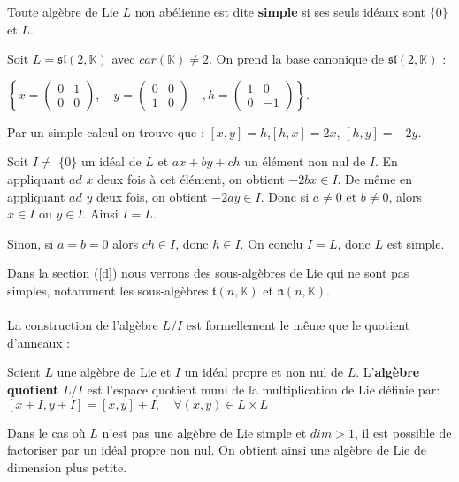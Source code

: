 \documentclass[a4paper,openany,12pt]{report}
\newcommand{\KK}{\mathbb{K}}
\newcommand{\ssl}{\mathfrak{sl}}
\newcommand{\ttt}{\mathfrak{t}}
\newcommand{\nn}{\mathfrak{n}}
\theoremstyle{break}
{\theorembodyfont{\upshape}
\newtheorem*{rmq}{Remarque :}
\newtheorem*{prv}{Preuve :}
\newtheorem*{ex}{Exemples :}
\newtheorem*{exe}{Exemple : }
\newtheorem*{nota}{Notation :}
\newtheorem*{dem}{D\'emonstration :}}
\begin{document}
\begin{df}
\quad Toute algèbre de Lie $L$ non abélienne est dite \textbf{simple} si ses seuls idéaux sont $\{ 0 \}$ et $L$.
\end{df}

\begin{exe}
\quad Soit $L = \ssl(2,\KK)$ avec $car(\KK)\ne 2$. On prend la base canonique de $\ssl(2,\KK)$ : 
\begin{center}
$\left \{ x=\begin{pmatrix} 0 & 1\\ 0 & 0 \end{pmatrix},\quad y=\begin{pmatrix} 0 & 0\\ 1 & 0 \end{pmatrix}\quad, h=\begin{pmatrix} 1 & 0\\ 0 & -1 \end{pmatrix} \right \}$.
\end{center} 

Par un simple calcul on trouve que : $[x,y]=h$,\quad $[h,x]=2x$, \quad $[h,y]=-2y$.

Soit $I \ne$ $\{0 \}$ un idéal de $L$ et $ax+by+ch$ un élément non nul de $I$. En appliquant  $ad$ $x$ deux fois à cet élément, on obtient $-2bx\in I$. De même en appliquant $ad$ $y$ deux fois, on obtient $-2ay\in I$. Donc si $a \ne 0$ et $b \ne 0$, alors $x \in I $ ou $y \in I$. Ainsi $I=L$.

Sinon, si $a = b = 0$ alors $ch \in I$, donc $h \in I$. On conclu $I=L$, donc $L$ est simple.
\end{exe}

Dans la section (\ref{d}) nous verrons des sous-algèbres de Lie qui ne sont pas simples, notamment les sous-algèbres $\ttt(n,\KK)$ et $\nn(n,\KK)$.\\
\\

La construction de l'algèbre $L/I$ est formellement le même que le quotient d'anneaux :

\begin{df}
\quad Soient $L$ une algèbre de Lie et $I$ un idéal propre et non nul de $L$. L'\textbf{algèbre quotient} $L/I$ est l'espace quotient muni de la multiplication de Lie définie par:
\center $[x+I, y+I]=[x, y]+I, \quad \forall(x, y) \in L \times L$
\end{df}

\begin{rmq}
\quad Dans le cas où $L$ n'est pas une algèbre de Lie simple et $dim>1$, il est possible de factoriser par un idéal propre non nul. On obtient ainsi une algèbre de Lie de dimension plus petite.
\end{rmq}
\end{document}

